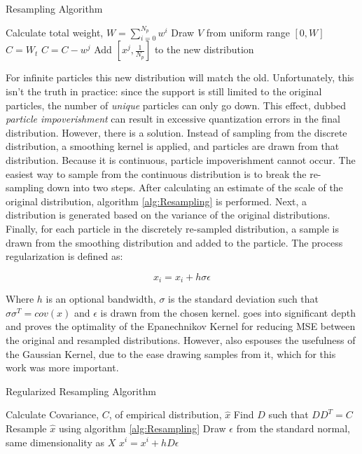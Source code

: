 \begin{algorithm}
\caption{Resampling Algorithm}
\begin{algorithmic}
\STATE Calculate total weight, $W = \sum_{i=0}^{N_p} w^i$
    \STATE Draw $V$ from uniform range $[0, W]$
    \STATE $C = W_t$
        \STATE $C = C - w^j$
    \ENDFOR
    \STATE Add $[x^j, \frac{1}{N_p}]$ to the new distribution
\ENDFOR
\STATE 
\end{algorithmic}
\label{alg:Resampling}
\end{algorithm}
For infinite particles this new distribution will match the old.
Unfortunately, this isn't the truth in practice: since the support is
still limited to the original particles, the number of \emph{unique} particles can only go down.
This effect, dubbed \emph{particle impoverishment} can result in excessive quantization
errors in the final distribution. However, there is a solution. Instead of sampling from the
discrete distribution, a smoothing kernel is applied, and particles are drawn from
that distribution. Because it is continuous, particle impoverishment
cannot occur. The easiest way to sample from the continuous distribution is to break the 
re-sampling down into two steps. After calculating an estimate of the scale of the original
distribution, algorithm \autoref{alg:Resampling} is performed. Next, a distribution is generated
based on the variance of the original distributions.
Finally, for each particle in the discretely re-sampled distribution, a sample is drawn from 
the smoothing 
distribution and added to the particle.  The process regularization is defined as:

\begin{equation}
x_i = x_i + h\sigma \epsilon
\end{equation}

Where $h$ is an optional bandwidth, $\sigma$ is the standard deviation such that 
$\sigma \sigma^T = cov(x)$
and $\epsilon$ is drawn from the chosen kernel. \cite{Musso2001a} goes into
significant 
depth and proves the optimality of the Epanechnikov Kernel for reducing 
MSE between the original and resampled distributions. However, \cite{Musso2001a}
also espouses the usefulness of the Gaussian Kernel, due to the ease
drawing samples from it, which for this work was more important.

\begin{algorithm}
\caption{Regularized Resampling Algorithm}
\begin{algorithmic}
\STATE Calculate Covariance, $C$, of empirical distribution, $\hat{x}$
\STATE Find $D$ such that $DD^T = C$
\STATE Resample $\hat{x}$ using algorithm \autoref{alg:Resampling}
    \STATE Draw $\epsilon$ from the standard normal, same dimensionality as $X$
    \STATE $x^i = x^i + hD\epsilon$
\ENDFOR
\end{algorithmic}
\label{alg:RegResampling}
\end{algorithm}

